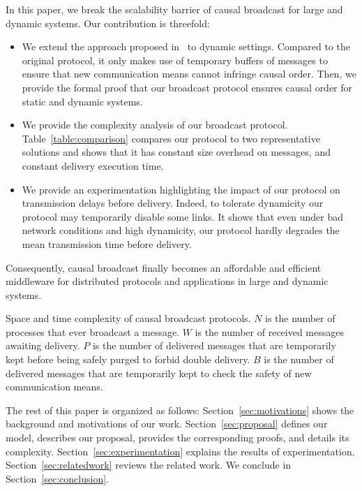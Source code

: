 In this paper, we break the scalability barrier of causal broadcast for large
and dynamic systems.  Our contribution is threefold:
\begin{itemize}[leftmargin=*]
\item We extend the approach proposed in~\cite{friedman2004causal} to dynamic
  settings. Compared to the original protocol, it only makes use of temporary
  buffers of messages to ensure that new communication means cannot infringe
  causal order.  Then, we provide the formal proof that our broadcast protocol
  ensures causal order for static and dynamic systems.
\item We provide the complexity analysis of our broadcast
  protocol. Table~\ref{table:comparison} compares our protocol to two
  representative solutions and shows that it has constant size overhead on
  messages, and constant delivery execution time.
\item We provide an experimentation highlighting the impact of our protocol on
  transmission delays before delivery. Indeed, to tolerate dynamicity our
  protocol may temporarily disable some links.  It shows that even under bad
  network conditions and high dynamicity, our protocol hardly degrades
  the mean transmission time before delivery.
\end{itemize}
Consequently, causal broadcast finally becomes an affordable and efficient
middleware for distributed protocols and applications in large and dynamic
systems.

\begin{table}
  \caption{\label{table:comparison} Space and time complexity of causal
    broadcast protocols. 
    $N$ is the number of processes that ever broadcast a message.
    $W$ is the number of received messages awaiting delivery.
    $P$ is the number of delivered messages that are temporarily kept before 
    being safely purged to forbid double delivery.
    $B$ is the number of delivered messages that are temporarily kept to check the safety of new communication means.}
  
\end{table}

The rest of this paper is organized as follows: Section~\ref{sec:motivations}
shows the background and motivations of our work. Section~\ref{sec:proposal}
defines our model, describes our proposal, provides the corresponding proofs,
and details its complexity. Section~\ref{sec:experimentation} explains the
results of experimentation.  Section~\ref{sec:relatedwork} reviews the related
work. We conclude in Section~\ref{sec:conclusion}.


